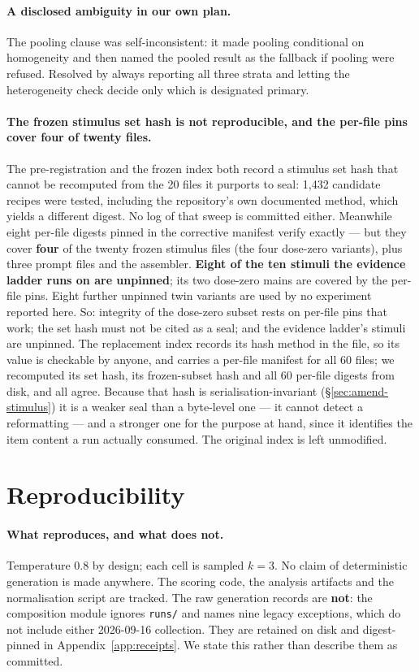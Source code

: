 \documentclass{article}
\begin{document}
\paragraph{A disclosed ambiguity in our own plan.} The pooling clause was
  self-inconsistent: it made pooling conditional on homogeneity and then named
  the pooled result as the fallback if pooling were refused. Resolved by always
  reporting all three strata and letting the heterogeneity check decide only
  which is designated primary.

\paragraph{The frozen stimulus set hash is not reproducible, and the per-file
pins cover four of twenty files.} The pre-registration and the frozen index both
record a stimulus set hash that cannot be recomputed from the 20 files it
purports to seal: 1,432 candidate recipes were tested, including the
repository's own documented method, which yields a different digest. No log of
that sweep is committed either. Meanwhile eight per-file digests pinned in the
corrective manifest verify exactly --- but they cover \textbf{four} of the
twenty frozen stimulus files (the four dose-zero variants), plus three prompt
files and the assembler. \textbf{Eight of the ten stimuli the evidence ladder
runs on are unpinned}; its two dose-zero mains are covered by the per-file pins.
Eight further unpinned twin variants are used by no experiment reported here. So: integrity of the dose-zero subset rests on
per-file pins that work; the set hash must not be cited as a seal; and the
evidence ladder's stimuli are unpinned. The replacement index records its hash
method in the file, so its value is checkable by anyone, and carries a per-file
manifest for all 60 files; we recomputed its set hash, its frozen-subset hash
and all 60 per-file digests from disk, and all agree. Because that hash is
serialisation-invariant (\S\ref{sec:amend-stimulus}) it is a weaker seal than a
byte-level one --- it cannot detect a reformatting --- and a stronger one for
the purpose at hand, since it identifies the item content a run actually
consumed. The original index is left unmodified.

\section{Reproducibility}
\label{sec:repro}

\paragraph{What reproduces, and what does not.} Temperature 0.8 by design; each cell
  is sampled $k=3$. No claim of deterministic generation is made anywhere. The scoring code, the analysis artifacts and the
  normalisation script are tracked. The raw generation records are \textbf{not}:
  the composition module ignores \texttt{runs/} and names nine legacy
  exceptions, which do not include either 2026-09-16 collection. They are
  retained on disk and digest-pinned in Appendix~\ref{app:receipts}. We state
  this rather than describe them as committed.
\end{document}
